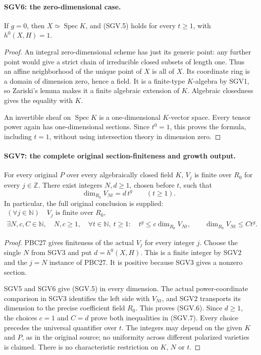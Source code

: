 \documentclass[11pt,a4paper]{article}
\numberwithin{equation}{section}
\theoremstyle{remark}\newtheorem{remark}[theorem]{Remark}
\begin{document}
\paragraph{SGV6: the zero-dimensional case.}
\label{claim:SGV6}
If $g=0$, then $X\simeq\operatorname{Spec}K$, and (SGV.5) holds
for every $t\ge1$, with $h^0(X,H)=1$.

\begin{proof}
An integral zero-dimensional scheme has just its generic point:
any further point would give a strict chain of irreducible closed
subsets of length one.  Thus an affine neighborhood of the unique
point of $X$ is all of $X$.  Its coordinate ring is a domain of
dimension zero, hence a field.  It is a finite-type $K$-algebra by
SGV1, so Zariski's lemma makes it a finite algebraic extension of $K$.
Algebraic closedness gives the equality with $K$.

An invertible sheaf on $\operatorname{Spec}K$ is a one-dimensional
$K$-vector space.  Every tensor power again has one-dimensional
sections.  Since $t^0=1$, this proves the formula, including $t=1$,
without using intersection theory in dimension zero.
\end{proof}

\paragraph{SGV7: the complete original section-finiteness and growth output.}
\label{claim:SGV7}
For every original $P$ over every algebraically closed field $K$,
$V_j$ is finite over $R_0$ for every $j\in\mathbb Z$.
There exist integers $N,d\ge1$, chosen before $t$, such that
\[
 \dim_{R_0}V_{Nt}=d\,t^g\qquad(t\ge1).
                                                        \tag{SGV.6}
\]
In particular, the full original conclusion is supplied:
\[
 \begin{gathered}
  (\forall j\in\mathbb N)\quad V_j\text{ is finite over }R_0,\\
  \exists N,c,C\in\mathbb N,\quad N,c\ge1,\quad
  \forall t\in\mathbb N,\ t\ge1:\quad
  t^g\le c\dim_{R_0}V_{Nt},\qquad
  \dim_{R_0}V_{Nt}\le C t^g.
 \end{gathered}
                                                        \tag{SGV.7}
\]

\begin{proof}
PBC27 gives finiteness of the actual $V_j$ for every integer $j$.
Choose the single $N$ from SGV3 and put $d=h^0(X,H)$.
This is a finite integer by SGV2 and the $j=N$ instance of PBC27.
It is positive because SGV3 gives a nonzero section.

SGV5 and SGV6 give (SGV.5) in every dimension.  The actual
power-coordinate comparison in SGV3 identifies the left side with
$V_{Nt}$, and SGV2 transports its dimension to the precise coefficient
field $R_0$.  This proves (SGV.6).  Since $d\ge1$, the choices
$c=1$ and $C=d$ prove both inequalities in (SGV.7).
Every choice precedes the universal quantifier over $t$.
The integers may depend on the given $K$ and $P$, as in the original
source; no uniformity across different polarized varieties is claimed.
There is no characteristic restriction on $K$, $N$ or $t$.
\end{proof}
\end{document}
